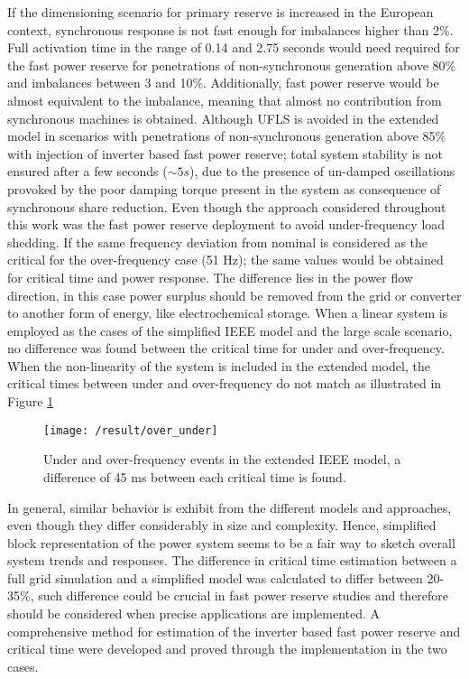 If the dimensioning scenario for primary reserve is increased in the European context, synchronous response is not fast enough for imbalances higher than 2\%. Full activation time in the range of 0.14 and 2.75 seconds would need required for the fast power reserve for penetrations of non-synchronous generation above 80\% and imbalances between 3 and 10\%. Additionally, fast power reserve would be almost equivalent to the imbalance, meaning that almost no contribution from synchronous machines is obtained. Although UFLS is avoided in the extended model in scenarios with penetrations of non-synchronous generation above 85\% with injection of inverter based fast power reserve; total system stability is not ensured after a few seconds ($ \sim5 s $), due to the presence of un-damped oscillations provoked by the poor damping torque present in the system as consequence of synchronous share reduction. Even though the approach considered throughout this work was the fast power reserve deployment to avoid under-frequency load shedding. If the same frequency deviation from nominal is considered as the critical for the over-frequency case (51 Hz); the same values would be obtained for critical time and power response. The difference lies in the power flow direction, in this case power surplus should be removed from the grid or converter to another form of energy, like electrochemical storage. When a linear system is employed as the cases of the simplified IEEE model and the large scale scenario, no difference was found between the critical time for under and over-frequency. When the non-linearity of the system is included in the extended model, the critical times between under and over-frequency do not match as illustrated in Figure \ref{fig:res_over_under}\\

\begin{figure}[h]
	\centering
	\texttt{[image: /result/over\_under]}
	\caption{Under and over-frequency events in the extended IEEE model, a difference of 45 ms between each critical time is found.}
	\label{fig:res_over_under}
\end{figure}

In general, similar behavior is exhibit from the different models and approaches, even though they differ considerably in size and complexity. Hence, simplified block representation of the power system seems to be a fair way to sketch overall system trends and responses. The difference in critical time estimation between a full grid simulation and a simplified model was calculated to differ between 20-35\%, such difference could be crucial in fast power reserve studies and therefore should be considered when precise applications are implemented. A comprehensive method for estimation of the inverter based fast power reserve and critical time were developed and proved through the implementation in the two cases. 
